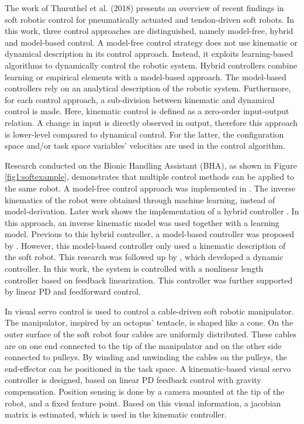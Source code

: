 The work of Thuruthel et al. (2018) \cite{george2018control} presents an overview of recent findings in soft robotic control for pneumatically actuated and tendon-driven soft robots. In this work, three control approaches are distinguished, namely model-free, hybrid and model-based control. A model-free control strategy does not use kinematic or dynamical description in its control approach. Instead, it exploits learning-based algorithms to dynamically control the robotic system. Hybrid controllers combine learning or empirical elements with a model-based approach. The model-based controllers rely on an analytical description of the robotic system. Furthermore, for each control approach, a sub-division between kinematic and dynamical control is made. Here, kinematic control is defined as a zero-order input-output relation. A change in input is directly observed in output, therefore this approach is lower-level compared to dynamical control. For the latter, the configuration space and/or task space variables' velocities are used in the control algorithm. 


Research conducted on the Bionic Handling Assistant (BHA), as shown in Figure \ref{fig1:softexample}, demonstrates that multiple control methods can be applied to the same robot. A model-free control approach was implemented in \cite{rolf2013efficient}. The inverse kinematics of the robot were obtained through machine learning, instead of model-derivation. Later work shows the implementation of a hybrid controller \cite{reinhart2017hybrid}. In this approach, an inverse kinematic model was used together with a learning model. Previous to this hybrid controller, a model-based controller was proposed by \cite{mahl2014bhakin}. However, this model-based controller only used a kinematic description of the soft robot. This research was followed up by \cite{falkenhahn2016dynamic}, which developed a dynamic controller. In this work, the system is controlled with a nonlinear length controller based on feedback linearization. This controller was further supported by linear PD and feedforward control. 

In \cite{wang2013visual} visual servo control is used to control a cable-driven soft robotic manipulator. The manipulator, inspired by an octopus' tentacle, is shaped like a cone. On the outer surface of the soft robot four cables are uniformly distributed. These cables are on one end connected to the tip of the manipulator and on the other side connected to pulleys. By winding and unwinding the cables on the pulleys, the end-effector can be positioned in the task space. A kinematic-based visual servo controller is designed, based on linear PD feedback control with gravity compensation. Position sensing is done by a camera mounted at the tip of the robot, and a fixed feature point. Based on this visual information, a jacobian matrix is estimated, which is used in the kinematic controller.

